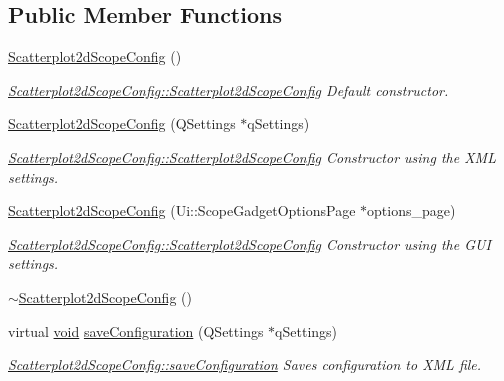 \subsection*{Public Member Functions}
\begin{DoxyCompactItemize}
\item 
\hyperlink{group___scope_plugin_gafdcf057f46ce7c284b969bf8d0a8fe0e}{Scatterplot2d\-Scope\-Config} ()
\begin{DoxyCompactList}\small\item\em \hyperlink{group___scope_plugin_gafdcf057f46ce7c284b969bf8d0a8fe0e}{Scatterplot2d\-Scope\-Config\-::\-Scatterplot2d\-Scope\-Config} Default constructor. \end{DoxyCompactList}\item 
\hyperlink{group___scope_plugin_ga3f0c68575d63ef6831f8e28d5835e056}{Scatterplot2d\-Scope\-Config} (Q\-Settings $\ast$q\-Settings)
\begin{DoxyCompactList}\small\item\em \hyperlink{group___scope_plugin_gafdcf057f46ce7c284b969bf8d0a8fe0e}{Scatterplot2d\-Scope\-Config\-::\-Scatterplot2d\-Scope\-Config} Constructor using the X\-M\-L settings. \end{DoxyCompactList}\item 
\hyperlink{group___scope_plugin_gab4f886463a61e05057f4fc3043b08f9e}{Scatterplot2d\-Scope\-Config} (Ui\-::\-Scope\-Gadget\-Options\-Page $\ast$options\-\_\-page)
\begin{DoxyCompactList}\small\item\em \hyperlink{group___scope_plugin_gafdcf057f46ce7c284b969bf8d0a8fe0e}{Scatterplot2d\-Scope\-Config\-::\-Scatterplot2d\-Scope\-Config} Constructor using the G\-U\-I settings. \end{DoxyCompactList}\item 
\hyperlink{group___scope_plugin_gad761d10c520b7bbeabfd1eac13b8d6d9}{$\sim$\-Scatterplot2d\-Scope\-Config} ()
\item 
virtual \hyperlink{group___u_a_v_objects_plugin_ga444cf2ff3f0ecbe028adce838d373f5c}{void} \hyperlink{group___scope_plugin_ga37a87c7a797180e5634b24238137d996}{save\-Configuration} (Q\-Settings $\ast$q\-Settings)
\begin{DoxyCompactList}\small\item\em \hyperlink{group___scope_plugin_ga37a87c7a797180e5634b24238137d996}{Scatterplot2d\-Scope\-Config\-::save\-Configuration} Saves configuration to X\-M\-L file. \end{DoxyCompactList}\item 

\end{DoxyCompactItemize}
